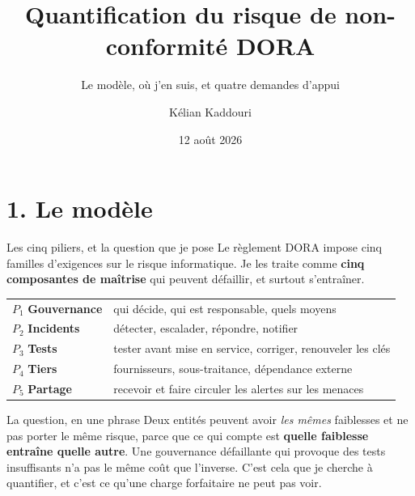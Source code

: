 \documentclass[11pt]{beamer}
\title[Point de stage]{Quantification du risque de non-conformité DORA}
\subtitle{Le modèle, où j'en suis, et quatre demandes d'appui}
\author[K. Kaddouri]{Kélian Kaddouri}
\institute[ENSAE / Nexialog]{ENSAE / Nexialog Consulting}
\date[12/08/2026]{12 août 2026}
\begin{document}

\begin{frame}
\titlepage
\end{frame}

\section*{1. Le modèle}

\begin{frame}{Les cinq piliers, et la question que je pose}
\small
Le règlement DORA impose cinq familles d'exigences sur le risque informatique. Je les traite
comme \textbf{cinq composantes de maîtrise} qui peuvent défaillir, et surtout s'entraîner.
\vspace{1.5mm}
\begin{center}\scriptsize
\begin{tabular}{@{}l l@{}}
\toprule
$P_1$ \textbf{Gouvernance} & qui décide, qui est responsable, quels moyens \\
$P_2$ \textbf{Incidents} & détecter, escalader, répondre, notifier \\
$P_3$ \textbf{Tests} & tester avant mise en service, corriger, renouveler les clés \\
$P_4$ \textbf{Tiers} & fournisseurs, sous-traitance, dépendance externe \\
$P_5$ \textbf{Partage} & recevoir et faire circuler les alertes sur les menaces \\
\bottomrule
\end{tabular}
\end{center}
\vspace{1.5mm}
\begin{block}{La question, en une phrase}
Deux entités peuvent avoir \emph{les mêmes} faiblesses et ne pas porter le même risque, parce
que ce qui compte est \textbf{quelle faiblesse entraîne quelle autre}. Une gouvernance
défaillante qui provoque des tests insuffisants n'a pas le même coût que l'inverse. C'est cela
que je cherche à quantifier, et c'est ce qu'une charge forfaitaire ne peut pas voir.
\end{block}
\end{frame}
\end{document}
